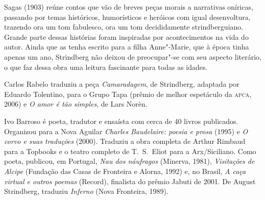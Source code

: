 \begin{resumopage}
\item[Sagas] (1903) reúne contos que vão de breves peças morais a narrativas oníricas, 
passando por temas históricos, humorísticos e heróicos com igual desenvoltura, trazendo 
ora um tom fabulesco, ora um tom decididamente strindberguiano. Grande parte dessas histórias 
foram inspiradas por acontecimentos na vida do autor. Ainda que as tenha escrito para a filha Anne{}"-Marie, 
que à época tinha apenas um ano, Strindberg não deixou de preocupar{}"-se com seu aspecto literário, 
o que faz dessa obra uma leitura fascinante para todas as idades.

\item[Carlos Rabelo] traduziu a peça \textit{Camaradagem}, de Strindberg, adaptada por Eduardo Tolentino, 
para o Grupo Tapa (prêmio de melhor espetáculo da \textsc{apca}, 2006) e \textit{O amor é tão simples}, de Lars Norèn.

\item[Ivo Barroso] é poeta, tradutor e ensaísta com cerca de 40 livros publicados. 
Organizou para a Nova Aguilar \textit{Charles Baudelaire: poesia e prosa} (1995) e \textit{O corvo e suas traduções} (2000). 
Traduziu a obra completa de Arthur Rimbaud para a Topbooks e o teatro completo de T.~S.~Eliot para a Arx/Siciliano. 
Como poeta, publicou, em Portugal, \textit{Nau dos náufragos} (Minerva, 1981), \textit{Visitações de Alcipe} (Fundação das Casas de 
Fronteira e Alorna, 1992) e, no Brasil, \textit{A caça virtual e outros  poemas} (Record), finalista do prêmio Jabuti de 2001. 
De August Strindberg, traduziu \textit{Inferno} (Nova Fronteira, 1989).

\end{resumopage}

